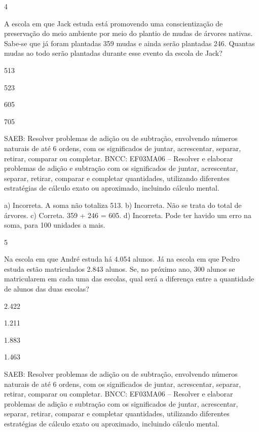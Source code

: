 \begin{escolha}
{\begin{escolha}
{\num{4}

A escola em que Jack estuda está promovendo uma conscientização de
preservação do meio ambiente por meio do plantio de mudas de árvores
nativas. Sabe-se que já foram plantadas 359 mudas e ainda serão
plantadas 246. Quantas mudas ao todo serão plantadas durante esse evento
da escola de Jack?

\begin{escolha}
\item
  513
\item
  523
\item
  605
\item
  705
\end{escolha}

SAEB: Resolver problemas de adição ou de subtração,
envolvendo números naturais de até 6 ordens, com os significados de
juntar, acrescentar, separar, retirar, comparar ou completar.
BNCC: EF03MA06 – Resolver e elaborar problemas de adição e subtração com os significados de
juntar, acrescentar, separar, retirar, comparar e completar quantidades, utilizando diferentes
estratégias de cálculo exato ou aproximado, incluindo cálculo mental.

a) Incorreta. A soma não totaliza 513.
b) Incorreta. Não se trata do total de árvores.
c) Correta. 359 + 246 = 605.
d) Incorreta. Pode ter havido um erro na soma, para 100 unidades a mais.

\num{5}

Na escola em que André estuda há 4.054 alunos. Já na escola em que
Pedro estuda estão matriculados 2.843 alunos. Se, no próximo ano, 300
alunos se matricularem em cada uma das escolas, qual será a diferença
entre a quantidade de alunos das duas escolas?

\begin{escolha}
\item
  2.422
\item
  1.211
\item
  1.883
\item
  1.463
\end{escolha}


SAEB: Resolver problemas de adição ou de subtração,
envolvendo números naturais de até 6 ordens, com os significados de
juntar, acrescentar, separar, retirar, comparar ou completar.
BNCC: EF03MA06 – Resolver e elaborar problemas de adição e subtração com os significados de
juntar, acrescentar, separar, retirar, comparar e completar quantidades, utilizando diferentes
estratégias de cálculo exato ou aproximado, incluindo cálculo mental.

}
\end{escolha}}
\end{escolha}
